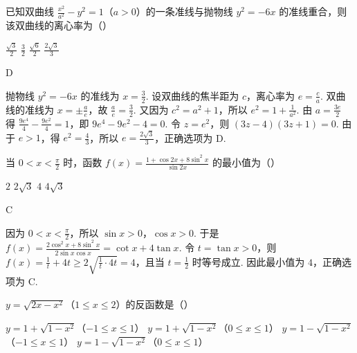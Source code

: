 \begin{problem}
已知双曲线 \(\frac{x^2}{a^2} - y^2 = 1\)（\(a>0\)）的一条准线与抛物线 \(y^2=-6x\) 的准线重合，则该双曲线的离心率为（\quad）

\choices
    {\(\frac{\sqrt{3}}{2}\)}
    {\(\frac{3}{2}\)}
    {\(\frac{\sqrt{6}}{2}\)}
    {\(\frac{2\sqrt{3}}{3}\)}
\end{problem}

\begin{answer}
D
\end{answer}

\begin{solution}
抛物线 \(y^{2}=-6x\) 的准线为 \(x=\frac{3}{2}\). 设双曲线的焦半距为 \(c\)，离心率为 \(e=\frac{c}{a}\). 双曲线的准线为 \(x=\pm\frac{a}{e}\)，故 \(\frac{a}{e}=\frac{3}{2}\). 又因为 \(c^{2}=a^{2}+1\)，所以 \(e^{2}=1+\frac{1}{a^{2}}\). 由 \(a=\frac{3e}{2}\) 得 \(\frac{9e^{4}}{4}-\frac{9e^{2}}{4}=1\)，即 \(9e^{4}-9e^{2}-4=0\). 令 \(z=e^{2}\)，则 \((3z-4)(3z+1)=0\). 由于 \(e>1\)，得 \(e^{2}=\frac{4}{3}\)，所以 \(e=\frac{2\sqrt{3}}{3}\)，正确选项为 D.
\end{solution}

\begin{problem}
当 \(0<x<\frac{\pi}{2}\) 时，函数 \(f(x)=\frac{1+\cos2x+8\sin^2x}{\sin2x}\) 的最小值为（\quad）

\choices
    {\(2\)}
    {\(2\sqrt{3}\)}
    {\(4\)}
    {\(4\sqrt{3}\)}
\end{problem}

\begin{answer}
C
\end{answer}

\begin{solution}
因为 \(0<x<\frac{\pi}{2}\)，所以 \(\sin x>0\)，\(\cos x>0\). 于是
\(f(x)=\frac{2\cos^{2}x+8\sin^{2}x}{2\sin x\cos x}=\cot x+4\tan x\). 令 \(t=\tan x>0\)，则 \(f(x)=\frac{1}{t}+4t\geqslant2\sqrt{\frac{1}{t}\cdot4t}=4\)，且当 \(t=\frac{1}{2}\) 时等号成立. 因此最小值为 \(4\)，正确选项为 C.
\end{solution}

\begin{problem}
\(y = \sqrt{2x - x^2}\)（\(1 \leqslant x \leqslant 2\)）的反函数是（\quad）

\choices
    {\(y = 1 + \sqrt{1 - x^2}\)（\(-1 \leqslant x \leqslant 1\)）}
    {\(y = 1 + \sqrt{1 - x^2}\)（\(0 \leqslant x \leqslant 1\)）}
    {\(y = 1 - \sqrt{1 - x^2}\)（\(-1 \leqslant x \leqslant 1\)）}
    {\(y = 1 - \sqrt{1 - x^2}\)（\(0 \leqslant x \leqslant 1\)）}
\end{problem}

